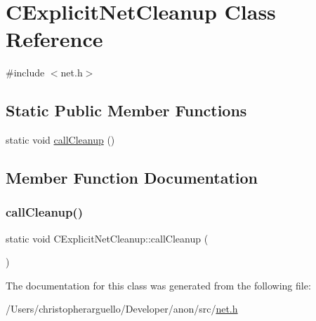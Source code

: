 \hypertarget{class_c_explicit_net_cleanup}{}\section{C\+Explicit\+Net\+Cleanup Class Reference}
\label{class_c_explicit_net_cleanup}


{\ttfamily \#include $<$net.\+h$>$}

\subsection*{Static Public Member Functions}
\begin{DoxyCompactItemize}
\item 
static void \mbox{\hyperlink{class_c_explicit_net_cleanup_ab17ed87c32880d754cb7bfe2b4797c55}{call\+Cleanup}} ()
\end{DoxyCompactItemize}


\subsection{Member Function Documentation}
\mbox{\label{class_c_explicit_net_cleanup_ab17ed87c32880d754cb7bfe2b4797c55}} 
\subsubsection{\texorpdfstring{call\+Cleanup()}{callCleanup()}}
{\footnotesize\ttfamily static void C\+Explicit\+Net\+Cleanup\+::call\+Cleanup (\begin{DoxyParamCaption}{ }\end{DoxyParamCaption})\hspace{0.3cm}{\ttfamily [static]}}



The documentation for this class was generated from the following file\+:\begin{DoxyCompactItemize}
\item 
/\+Users/christopherarguello/\+Developer/anon/src/\mbox{\hyperlink{net_8h}{net.\+h}}\end{DoxyCompactItemize}
